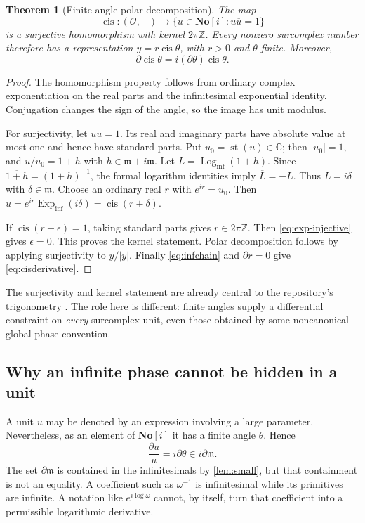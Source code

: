 \documentclass[11pt,letterpaper]{article}
\numberwithin{equation}{section}
\newtheorem{theorem}{Theorem}[section]
\theoremstyle{definition}
\theoremstyle{remark}
\newcommand{\SC}{\mathbf{No}[i]}
\newcommand{\C}{\mathbb C}
\newcommand{\Z}{\mathbb Z}
\newcommand{\OO}{\mathcal O}
\newcommand{\mm}{\mathfrak m}
\newcommand{\D}{\partial}
\newcommand{\Einf}{\operatorname{Exp}_{\mathrm{inf}}}
\newcommand{\Linf}{\operatorname{Log}_{\mathrm{inf}}}
\newcommand{\cis}{\operatorname{cis}}
\newcommand{\st}{\operatorname{st}}
\begin{document}
\begin{theorem}[Finite-angle polar decomposition]\label{thm:polar}
The map
\[
 \cis:(\OO,+)\longrightarrow
       \{u\in\SC:u\overline u=1\}
\]
is a surjective homomorphism with kernel $2\pi\Z$. Every nonzero surcomplex
number therefore has a representation $y=r\cis\theta$, with $r>0$ and
$\theta$ finite. Moreover,
\begin{equation}\label{eq:cisderivative}
 \D\cis\theta=i(\D\theta)\cis\theta.
\end{equation}
\end{theorem}
\begin{proof}
The homomorphism property follows from ordinary complex exponentiation on
the real parts and the infinitesimal exponential identity. Conjugation
changes the sign of the angle, so the image has unit modulus.

For surjectivity, let $u\overline u=1$. Its real and imaginary parts have
absolute value at most one and hence have standard parts. Put
$u_0=\st(u)\in\C$; then $|u_0|=1$, and
$u/u_0=1+h$ with $h\in\mm+i\mm$. Let
$L=\Linf(1+h)$. Since $\overline{1+h}=(1+h)^{-1}$, the formal logarithm
identities imply $\overline L=-L$. Thus $L=i\delta$ with $\delta\in\mm$.
Choose an ordinary real $r$ with $e^{ir}=u_0$. Then
$u=e^{ir}\Einf(i\delta)=\cis(r+\delta)$.

If $\cis(r+\epsilon)=1$, taking standard parts gives $r\in2\pi\Z$.
Then \eqref{eq:exp-injective} gives $\epsilon=0$. This proves the kernel
statement. Polar decomposition follows by applying surjectivity to $y/|y|$.
Finally \eqref{eq:infchain} and $\D r=0$ give
\eqref{eq:cisderivative}.
\end{proof}

The surjectivity and kernel statement are already central to the repository's
trigonometry \cite{RepoTrig}. The role here is different: finite angles
supply a differential constraint on \emph{every} surcomplex unit, even those
obtained by some noncanonical global phase convention.

\subsection{Why an infinite phase cannot be hidden in a unit}
A unit $u$ may be denoted by an expression involving a large parameter.
Nevertheless, as an element of $\SC$ it has a finite angle $\theta$. Hence
\[
 \frac{\D u}{u}=i\D\theta\in i\D\mm.
\]
The set $\D\mm$ is contained in the infinitesimals by \cref{lem:small}, but
that containment is not an equality. A coefficient such as $\omega^{-1}$
is infinitesimal while its primitives are infinite. A notation like
$e^{i\log\omega}$ cannot, by itself, turn that coefficient into a permissible
logarithmic derivative.
\end{document}
